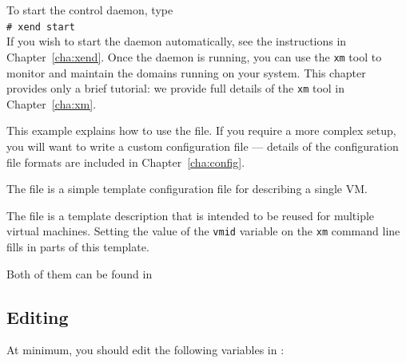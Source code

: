 \documentclass[11pt,twoside,final,openright]{xenstyle}
\begin{document}
To start the control daemon, type \\ \verb!# xend start! \\ If you
wish to start the daemon automatically, see the instructions in
Chapter~\ref{cha:xend}. Once the daemon is running, you can use the
{\tt xm} tool to monitor and maintain the domains running on your
system. This chapter provides only a brief tutorial: we provide full
details of the {\tt xm} tool in Chapter~\ref{cha:xm}. 

%
%
%

This example explains how to use the  file.  If you
require a more complex setup, you will want to write a custom
configuration file --- details of the configuration file formats are
included in Chapter~\ref{cha:config}.

The  file is a simple template configuration file
for describing a single VM.

The  file is a template description that is intended
to be reused for multiple virtual machines.  Setting the value of the
{\tt vmid} variable on the {\tt xm} command line
fills in parts of this template.

Both of them can be found in 
\subsection{Editing }

At minimum, you should edit the following variables in :
\end{document}
